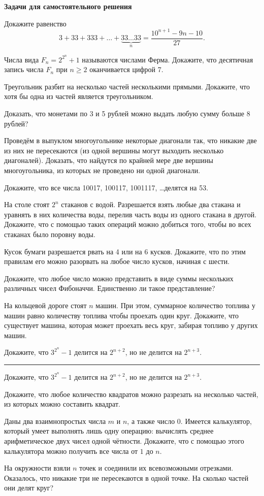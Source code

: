 {\bf Задачи для самостоятельного решения}
\begin{problems}
\item
Докажите равенство $$3 + 33 + 333 + \ldots + \underbrace{33 \ldots 33}_n = \dfrac{10^{n+1} - 9n - 10}{27}.$$
\item Числа вида $F_n = 2^{2^n} + 1$ называются числами Ферма. Докажите, что десятичная запись числа $F_n$ при $n \geqslant 2$ оканчивается цифрой 7.
\item Треугольник разбит на несколько частей несколькими прямыми. Докажите, что хотя бы одна из частей является треугольником.
\item Доказать, что монетами по 3 и 5 рублей можно выдать любую сумму больше 8 рублей?
\item Проведём в выпуклом многоугольнике некоторые диагонали так, что никакие две из них не пересекаются (из одной вершины могут выходить несколько диагоналей). Доказать, что найдутся по крайней мере две вершины многоугольника, из которых не проведено ни одной диагонали.
\item Докажите, что все числа 10017, 100117, 1001117, \ldots делятся на 53.
\item На столе стоят $2^n$ стаканов с водой. Разрешается взять любые два стакана и уравнять в них количества воды, перелив часть воды из одного стакана в другой. Докажите, что с помощью таких операций можно добиться того, чтобы во всех стаканах было поровну воды. 
\item Кусок бумаги разрешается рвать на 4 или на 6 кусков. Докажите, что по этим правилам его можно разорвать на любое число кусков, начиная с шести.
\item Докажите, что любое число можно представить в виде суммы нескольких различных чисел Фибоначчи. Единственно ли такое представление?
\item На кольцевой дороге стоят $n$ машин. При этом, суммарное количество топлива у машин  равно количеству топлива чтобы проехать один круг. Докажите, что существует машина, которая может проехать весь круг, забирая топливо у других машин.
\item Докажите, что $3^{2^n} - 1$ делится на $2^{n+2}$, но не делится на $2^{n+3}$.

\strut\hrule

\item Докажите, что $3^{2^n} - 1$ делится на $2^{n+2}$, но не делится на $2^{n+3}$.
\item Докажите,  что любое количество квадратов можно разрезать на несколько частей, из которых можно составить квадрат.
\item Даны два взаимнопростых числа $m$ и $n$, а также число 0. Имеется калькулятор, который умеет выполнять лишь одну операцию: вычислять среднее арифметическое двух чисел одной чётности. Докажите, что с помощью этого калькулятора можно получить все числа от $1$ до $n$.
\item  На окружности взяли $n$ точек и соединили их всевозможными отрезками. Оказалось, что никакие три не пересекаются в одной точке. На сколько частей они делят круг?
\end{problems}
